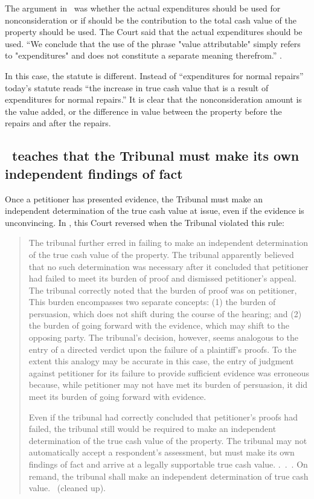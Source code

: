 \documentclass[12pt,\documentclassflag]{michiganCourtOfAppealsBrief}
\begin{document}
The argument in \cite[s]{Fisher}\ was whether the actual expenditures should be used for nonconsideration or if should be 
the contribution to the total cash value of the property should be used. The Court said that the actual expenditures should be used. ``We conclude that the use of the phrase "value attributable" simply refers to "expenditures" and does not constitute a separate meaning therefrom.'' . 

In this case, the statute is different. Instead of ``expenditures for normal repairs'' today's statute reads ``the increase in true cash value that is a result of expenditures for normal repairs.'' It is clear that the nonconsideration amount is the value added, or the difference in value between the property before the repairs and after the repairs.

\subsection{\cite{Jones & Laughlin}\ teaches that the Tribunal must make its own independent findings of fact}

Once a petitioner has presented evidence, the Tribunal must make an independent determination of the true cash value at issue, even if the evidence is unconvincing. In \cite[s]{Jones & Laughlin}, this Court reversed when the Tribunal violated this rule:

\begin{quotation}
The tribunal further erred in failing to make an independent determination of the true cash value of the property. The tribunal apparently believed that no such determination was necessary after it concluded that petitioner had failed to meet its burden of proof and dismissed petitioner's appeal. The tribunal correctly noted that the burden of proof was on petitioner, This burden encompasses two separate concepts: (1) the burden of persuasion, which does not shift during the course of the hearing; and (2) the burden of going forward with the evidence, which may shift to the opposing party. The tribunal's decision, however, seems analogous to the entry of a directed verdict upon the failure of a plaintiff's proofs. To the extent this analogy may be accurate in this case, the entry of judgment against petitioner for its failure to provide sufficient evidence was erroneous because, while petitioner may not have met its burden of persuasion, it did meet its burden of going forward with evidence.
	
	Even if the tribunal had correctly concluded that petitioner's proofs had failed, the tribunal still would be required to make an independent determination of the true cash value of the property. The tribunal may not automatically accept a respondent's assessment, but must make its own findings of fact and arrive at a legally supportable true cash value. .~.~. On remand, the tribunal shall make an independent determination of true cash value. \ (cleaned up).
\end{quotation}
\end{document}
